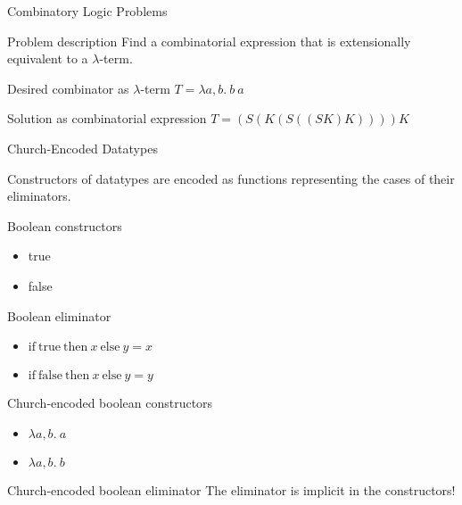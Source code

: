 \documentclass[mathserif]{beamer}
\newcommand{\n}[1]{\textrm{#1}}
\begin{document}
\begin{frame}{Combinatory Logic Problems}

\begin{block}{Problem description}
Find a combinatorial expression that is extensionally equivalent to a $\lambda$-term.
\end{block}

\begin{block}{Desired combinator as $\lambda$-term}
$T = \lambda a,b . ~ b ~ a$
\end{block}

\begin{block}{Solution as combinatorial expression}
$T = (S(K(S((SK)K))))K$
\end{block}

\end{frame}

\begin{frame}{Church-Encoded Datatypes}

Constructors of datatypes are encoded as functions representing the
cases of their eliminators.

\begin{block}{Boolean constructors}
\begin{itemize}
\item true
\item false
\end{itemize}
\end{block}

\begin{block}{Boolean eliminator}
\begin{itemize}
\item $\n{if} ~ \n{true} ~ \n{then} ~ x ~ \n{else} ~ y = x$
\item $\n{if} ~ \n{false} ~ \n{then} ~ x ~ \n{else} ~ y = y$
\end{itemize}
\end{block}

\begin{block}{Church-encoded boolean constructors}
\begin{itemize}
\item $\lambda a,b. ~ a$
\item $\lambda a,b. ~ b$
\end{itemize}
\end{block}

\begin{block}{Church-encoded boolean eliminator}
The eliminator is implicit in the constructors!
\end{block}



\end{frame}
\end{document}
